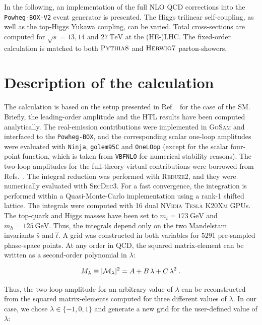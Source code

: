 \documentclass[a4paper]{jpconf}
\newcommand{\GeV}{\ensuremath{\mathrm{\:GeV}}}
\newcommand{\TeV}{\ensuremath{\mathrm{\:TeV}}}
\newcommand{\pythia}{\textsc{Pythia8}}
\newcommand{\herwig}{\textsc{Herwig7}}
\begin{document}
In the following, an implementation of the full NLO QCD corrections into the \texttt{Powheg-BOX-V2} event generator is presented. The Higgs trilinear self-coupling, as well as the top-Higgs Yukawa coupling, can be varied. Total cross-sections are computed for $\sqrt{s}=13,14$ and $27 \TeV$ at the (HE-)LHC. The fixed-order calculation is matched to both $\pythia$ and $\herwig$ parton-showers.

\section{Description of the calculation}

The calculation is based on the setup presented in Ref.~\cite{Heinrich:2017kxx} for the case of the SM. Briefly, the leading-order amplitude and the HTL results have been computed analytically. The real-emission contributions were implemented in \textsc{GoSam} and interfaced to the \texttt{Powheg-BOX}, and the corresponding scalar one-loop amplitudes were evaluated with \texttt{Ninja}, \texttt{golem95C} and \texttt{OneLOop} (except for the scalar four-point function, which is taken from \texttt{VBFNLO} for numerical stability reasons).
The two-loop amplitudes for the full-theory virtual contributions were borrowed from Refs.~\cite{}. The integral reduction was performed with \textsc{Reduze2}, and they were numerically evaluated with \textsc{SecDec3}. For a fast convergence, the integration is performed within a Quasi-Monte-Carlo implementation using a rank-1 shifted lattice. The integrals were computed with 16 dual \textsc{NVidia Tesla K20Xm} GPUs. The top-quark and Higgs masses have been set to $m_t=173 \GeV$ and $m_h = 125 \GeV$. Thus, the integrals depend only on the two Mandelstam invariants $\hat{s}$ and $\hat{t}$.
A grid was constructed in both variables for $5291$ pre-sampled phase-space points. At any order in QCD, the squared matrix-element can be written as a second-order polynomial in $\lambda$:

\begin{equation}
M_{\lambda} \equiv |{\cal M}_\lambda|^2=A+B\,\lambda + C\,\lambda^2\;.
\end{equation}

Thus, the two-loop amplitude for an arbitrary value of $\lambda$ can be reconstructed from the squared matrix-elements computed for three different values of $\lambda$. In our case, we chose $\lambda \in \lbrace -1, 0, 1 \rbrace$ and generate a new grid for the user-defined value of $\lambda$:
\end{document}

